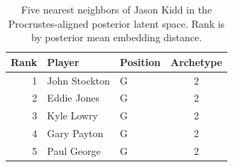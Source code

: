 \begin{table}[htbp]
  \centering\small
  \begin{tabular}{rllc}
    \toprule
    Rank & Player & Position & Archetype \\
    \midrule
    1 & John Stockton & G & 2 \\
    2 & Eddie Jones & G & 2 \\
    3 & Kyle Lowry & G & 2 \\
    4 & Gary Payton & G & 2 \\
    5 & Paul George & G & 2 \\
    \bottomrule
  \end{tabular}
  \caption{Five nearest neighbors of Jason Kidd in the Procrustes-aligned posterior latent space. Rank is by posterior mean embedding distance.}
\end{table}

